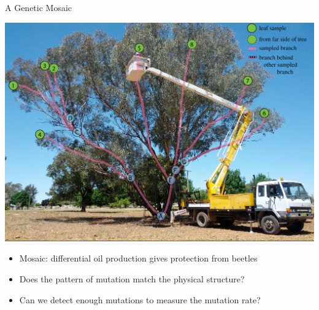 \documentclass[table]{beamer}
\begin{document}
\begin{frame}{A Genetic Mosaic}
	\begin{center}
	\includegraphics[width=.5\linewidth]{emel_1.jpg}
	\end{center}
	\begin{itemize}
		\item Mosaic: differential oil production gives protection from beetles
		\item Does the pattern of mutation match the physical structure?
		\item Can we detect enough mutations to measure the mutation rate?
	\end{itemize}
\end{frame}
\end{document}
